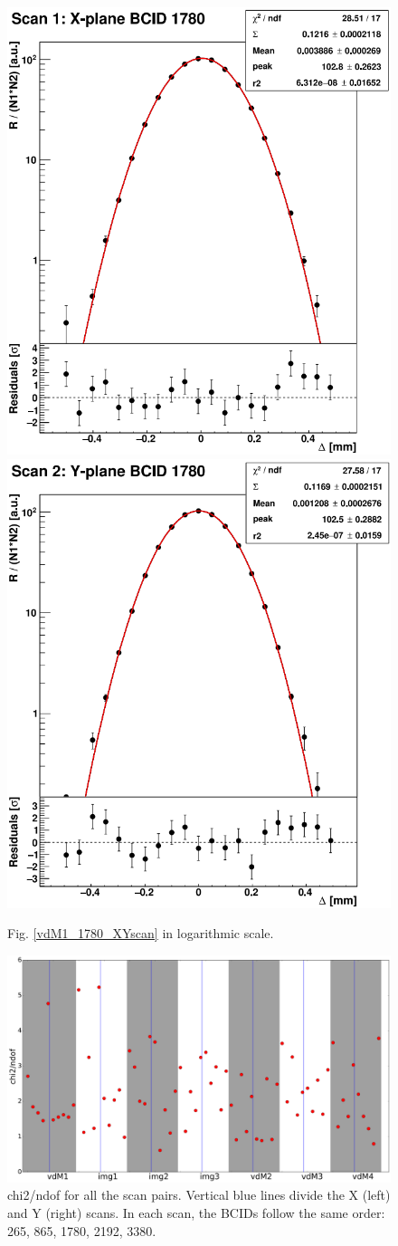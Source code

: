 \begin{center}
\begin{figure}[ht]
\centering
\includegraphics[width=.39\textwidth]{Chapter4/plots/xscan_logy.png}
\includegraphics[width=.39\textwidth]{Chapter4/plots/yscan_logy.png}
\caption[vdM1 BCID 1780 (logarithmic scale)]{Fig. \ref{vdM1_1780_XYscan} in logarithmic scale.}
\label{vdM1_1780_XYscan_logy}
\end{figure}
\end{center}

\begin{center}
  \begin{figure}[ht]
    \centering
    \includegraphics[scale=.20]{Chapter4/plots_thesis/chi2_Poly2G.png}
    \caption[chi2/ndof for all scan pairs]{ chi2/ndof for all the scan pairs. Vertical blue lines divide the X (left) and Y (right) scans. In each scan, the BCIDs follow the same order: 265, 865, 1780, 2192, 3380.} %
    \label{chi2/ndof}
  \end{figure}
\end{center}

